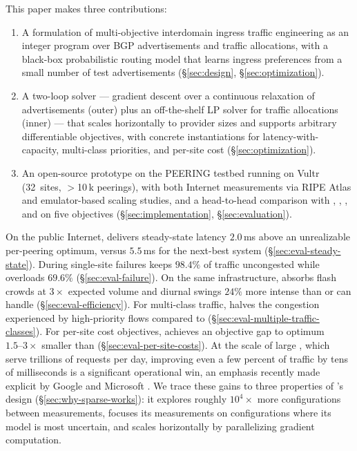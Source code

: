\documentclass[acmsmall,anonymous,review,nonacm,10pt]{acmart}
\begin{document}
  This paper makes three contributions:

\begin{enumerate}
\item A formulation of multi-objective interdomain ingress traffic
      engineering as an integer program over BGP advertisements and
      traffic allocations, with a black-box probabilistic routing
      model that learns ingress preferences from a small number of
      test advertisements (\S\ref{sec:design},
      \S\ref{sec:optimization}).
\item A two-loop solver --- gradient descent over a continuous
      relaxation of advertisements (outer) plus an off-the-shelf
      LP solver for traffic allocations (inner) --- that scales
      horizontally to provider sizes and supports arbitrary
      differentiable objectives, with concrete instantiations for
      latency-with-capacity, multi-class priorities, and per-site
      cost (\S\ref{sec:optimization}).
\item An open-source prototype on the PEERING testbed running on
      Vultr (32~sites, $>$10\,k peerings), with both Internet
      measurements via RIPE Atlas and emulator-based scaling
      studies, and a head-to-head comparison with \painter,
      \anyopt, \acast, and \ucast on five objectives
      (\S\ref{sec:implementation}, \S\ref{sec:evaluation}).
\end{enumerate}

  On the public Internet, \sparse delivers
steady-state latency $2.0$\,ms above an unrealizable per-peering
optimum, versus $5.5$\,ms for the next-best system \painter
(\S\ref{sec:eval-steady-state}).  During single-site failures
\sparse keeps $98.4\%$ of traffic uncongested while \painter
overloads $69.6\%$ (\S\ref{sec:eval-failure}).  On the same
infrastructure, \sparse absorbs flash crowds at $3\times$ expected
volume and diurnal swings $24\%$ more intense than \painter or
\ucast can handle (\S\ref{sec:eval-efficiency}).  For multi-class
traffic, \sparse halves the congestion experienced by high-priority
flows compared to \painter
(\S\ref{sec:eval-multiple-traffic-classes}).  For per-site cost
objectives, \sparse achieves an objective gap to optimum
$1.5\text{--}3\times$ smaller than \painter
(\S\ref{sec:eval-per-site-costs}).  At the scale of large
\servprods, which serve trillions of requests per day, improving
even a few percent of traffic by tens of milliseconds is a
significant operational win, an emphasis recently made explicit
by Google and Microsoft
\cite{virtue-gentle-aggression,google-protective-reroute}.  We
trace these gains to three
properties of \sparse's design (\S\ref{sec:why-sparse-works}):
it explores roughly $10^4\times$ more configurations between
measurements, focuses its measurements on configurations where its
model is most uncertain, and scales horizontally by parallelizing
gradient computation.
\end{document}
